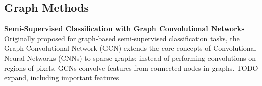 






  




\subsection{Graph Methods}


\noindent

\textbf{Semi-Supervised Classification with Graph Convolutional Networks} \cite{kipf2016semi}
\label{kipf2016semi}
Originally proposed for graph-based semi-supervised classification tasks, the Graph Convolutional Network (GCN) extends the core concepts of Convolutional Neural Networks (CNNs) to sparse graphs; instead of performing convolutions on regions of pixels, GCNs convolve features from connected nodes in graphs.
{\color{red} TODO expand, including important features}

